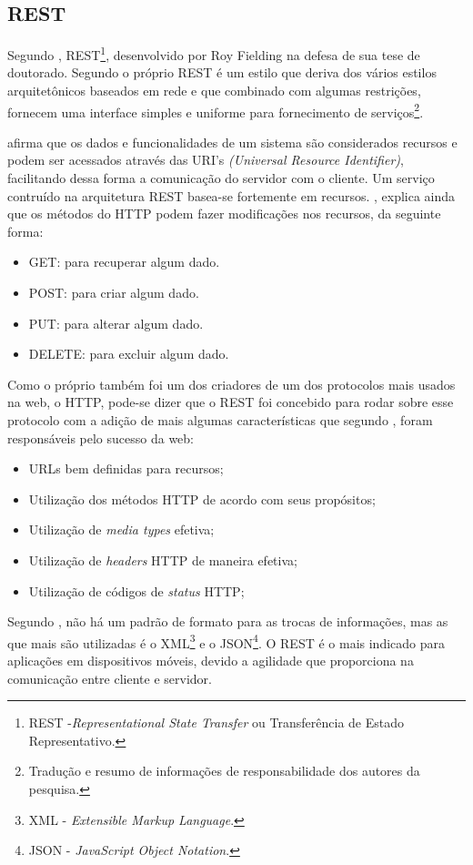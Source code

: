 \subsection{REST}
	
	\par Segundo , REST\footnote{REST
-\textit{Representational State Transfer} ou Transferência de Estado
Representativo.}, desenvolvido por Roy Fielding na defesa de sua tese de
doutorado. Segundo o próprio  REST é um estilo que
deriva dos vários estilos arquitetônicos baseados em rede e  que combinado com
algumas restrições, fornecem uma interface simples e uniforme para fornecimento
de serviços\footnote{Tradução e resumo de informações de responsabilidade dos
autores da pesquisa.}.
			
	\par {} afirma que os dados e funcionalidades de um sistema
são considerados recursos e podem ser acessados através das URI's
\textit{(Universal Resource Identifier)}, facilitando dessa forma a comunicação
do servidor com o cliente. Um serviço contruído na arquitetura REST basea-se
fortemente em recursos. , explica ainda que os métodos
do HTTP podem fazer modificações nos recursos, da seguinte forma:
	
	\begin{itemize}
		\item GET: para recuperar algum dado. 
		\item POST: para criar algum dado.
		\item PUT: para alterar algum dado. 
		\item DELETE: para excluir algum dado. 
	\end{itemize}

	\par Como o próprio  também foi um dos criadores de
um dos protocolos mais usados na web, o HTTP, pode-se dizer que o REST foi
concebido para rodar sobre esse protocolo com a adição de mais algumas
características que segundo , foram responsáveis pelo
sucesso da web:
		
	\begin{itemize}
		\item URLs bem definidas para recursos;
		\item Utilização dos métodos HTTP de acordo com seus propósitos;
		\item Utilização de \textit{media types} efetiva;
		\item Utilização de \textit{headers} HTTP de maneira efetiva;
		\item Utilização de códigos de \textit{status} HTTP;
	\end{itemize}
			 
	\par Segundo , não há um padrão de formato para as
 trocas de informações, mas as que mais são utilizadas é o XML\footnote{XML
 - \textit{Extensible Markup Language}.} e o JSON\footnote{JSON - 
 \textit{JavaScript Object Notation}.}. O REST é o mais indicado para aplicações
 em dispositivos móveis, devido a agilidade que proporciona na comunicação
 entre cliente e servidor.

